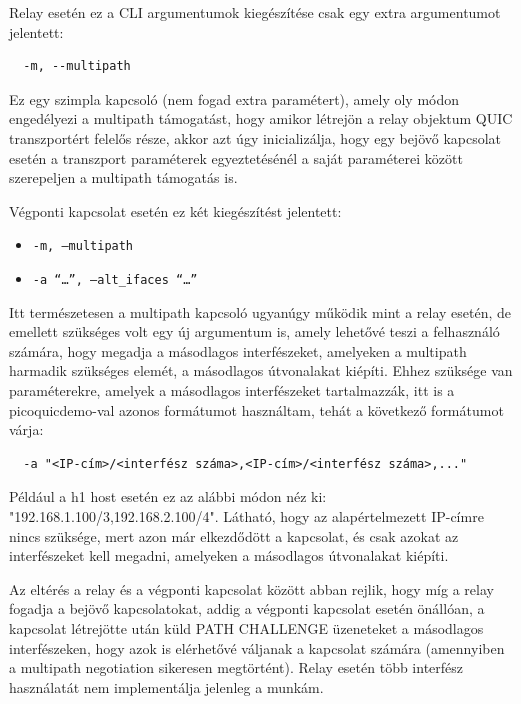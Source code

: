 \documentclass[a4paper,oneside]{article}
\begin{document}
Relay esetén ez a CLI argumentumok kiegészítése csak egy extra argumentumot jelentett:
\begin{verbatim}
  -m, --multipath
\end{verbatim}
Ez egy szimpla kapcsoló (nem fogad extra paramétert), amely oly módon engedélyezi a multipath támogatást, 
hogy amikor létrejön a relay objektum QUIC transzportért felelős része,
akkor azt úgy inicializálja, hogy egy bejövő kapcsolat esetén a transzport paraméterek 
egyeztetésénél a saját paraméterei között szerepeljen a multipath támogatás is.

Végponti kapcsolat esetén ez két kiegészítést jelentett:
\begin{itemize}
  \item \texttt{-m, --multipath}
  \item \texttt{-a ``\ldots'', --alt\_ifaces ``\ldots''}
\end{itemize}

Itt természetesen a multipath kapcsoló ugyanúgy működik mint a relay esetén,
de emellett szükséges volt egy új argumentum is, amely lehetővé teszi a felhasználó számára, hogy megadja a másodlagos interfészeket,
amelyeken a multipath harmadik szükséges elemét, a másodlagos útvonalakat kiépíti. Ehhez szüksége van paraméterekre, amelyek a másodlagos interfészeket
tartalmazzák, itt is a picoquicdemo-val azonos formátumot használtam, tehát a következő formátumot várja:
\begin{verbatim}
  -a "<IP-cím>/<interfész száma>,<IP-cím>/<interfész száma>,..."
\end{verbatim}
Például a h1 host esetén ez az alábbi módon néz ki: "192.168.1.100/3,192.168.2.100/4". Látható, hogy az alapértelmezett IP-címre nincs 
szüksége, mert azon már elkezdődött a kapcsolat, és csak azokat az interfészeket kell megadni, amelyeken a másodlagos útvonalakat kiépíti. 

Az eltérés a relay és a végponti kapcsolat között abban rejlik, hogy míg a relay fogadja a bejövő kapcsolatokat, addig a végponti kapcsolat esetén önállóan,
a kapcsolat létrejötte után küld PATH CHALLENGE üzeneteket a másodlagos interfészeken, 
hogy azok is elérhetővé váljanak a kapcsolat számára (amennyiben a multipath negotiation sikeresen megtörtént).
Relay esetén több interfész használatát nem implementálja jelenleg a munkám.

\paragraph{}
\end{document}
